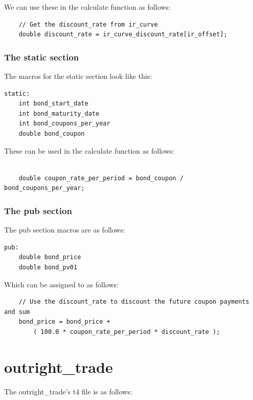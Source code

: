 \documentclass{report}
\begin{document}
We can use these in the calculate function as follows:

\begin{verbatim}
    // Get the discount_rate from ir_curve
    double discount_rate = ir_curve_discount_rate[ir_offset];
\end{verbatim}

\subsubsection{The static section}

The macros for the static section look like this:


\begin{verbatim}
static:
    int bond_start_date
    int bond_maturity_date
    int bond_coupons_per_year
    double bond_coupon
\end{verbatim}

These can be used in the calculate function as follows:

\begin{verbatim}

    double coupon_rate_per_period = bond_coupon / bond_coupons_per_year;

\end{verbatim}


\subsubsection{The pub section}

The pub section macros are as follows:

\begin{verbatim}
pub:
    double bond_price
    double bond_pv01

\end{verbatim}

Which can be assigned to as follows:

\begin{verbatim}
    // Use the discount_rate to discount the future coupon payments and sum
    bond_price = bond_price + 
        ( 100.0 * coupon_rate_per_period * discount_rate );
\end{verbatim}

\section{outright_trade}

The outright_trade's t4 file is as follows:
\end{document}
